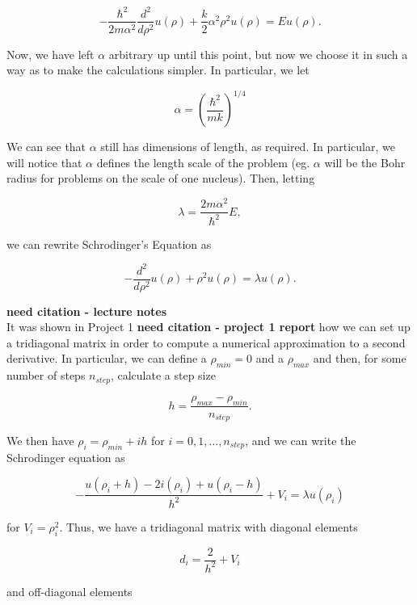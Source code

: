 \documentclass[12pt]{article}
\numberwithin{equation}{section}
\begin{document}
$$-\frac{\hbar^{2}}{2m\alpha^{2}}\frac{d^{2}}{d\rho^{2}}u\left(\rho\right)+\frac{k}{2}\alpha^{2}\rho^{2}u\left(\rho\right)=Eu\left(\rho\right).$$

\indent Now, we have left $\alpha$ arbitrary up until this point, but now we choose it in such a way as to make the calculations simpler.  In particular, we let 

\begin{equation}
\label{eq:alpha}
\alpha=\left(\frac{\hbar^{2}}{mk}\right)^{1/4}
\end{equation}

\noindent We can see that $\alpha$ still has dimensions of length, as required.  In particular, we will notice that $\alpha$ defines the length scale of the problem (eg. $\alpha$ will be the Bohr radius for problems on the scale of one nucleus).  Then, letting

$$\lambda=\frac{2m\alpha^{2}}{\hbar^{2}}E,$$

\noindent we can rewrite Schrodinger's Equation as

\begin{equation}
\label{eq:schrodfinal}
-\frac{d^{2}}{d\rho^{2}}u\left(\rho\right)+\rho^{2}u\left(\rho\right)=\lambda u\left(\rho\right).
\end{equation}

\noindent\textbf{need citation - lecture notes}  
\\\indent It was shown in Project 1 \textbf{need citation - project 1 report} how we can set up a tridiagonal matrix in order to compute a numerical approximation to a second derivative.  In particular, we can define a $\rho_{min}=0$ and a $\rho_{max}$ and then, for some number of steps $n_{step}$, calculate a step size

$$h=\frac{\rho_{max}-\rho_{min}}{n_{step}}.$$

\noindent We then have $\rho_{i}=\rho_{min}+ih$ for $i=0,1,\ldots,n_{step}$, and we can write the Schrodinger equation as

\begin{equation}
\label{eq:schrodapprox}
-\frac{u\left(\rho_{i}+h\right)-2i\left(\rho_{i}\right)+u\left(\rho_{i}-h\right)}{h^{2}}+V_{i}=\lambda u\left(\rho_{i}\right)
\end{equation}

\noindent for $V_{i}=\rho_{i}^{2}$.  Thus, we have a tridiagonal matrix with diagonal elements

$$d_{i}=\frac{2}{h^{2}}+V_{i}$$

\noindent and off-diagonal elements
\end{document}
